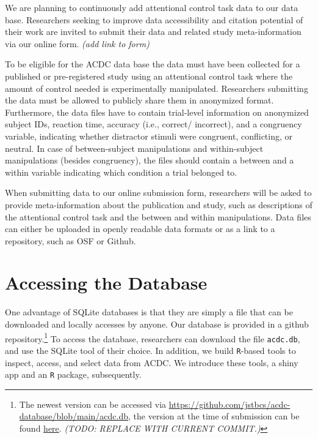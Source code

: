 \documentclass[
  man,floatsintext]{apa6}
\begin{document}
We are planning to continuously add attentional control task data to our data base. Researchers seeking to improve data accessibility and citation potential of their work are invited to submit their data and related study meta-information via our online form. \emph{ (add link to form)}

To be eligible for the ACDC data base the data must have been collected for a published or pre-registered study using an attentional control task where the amount of control needed is experimentally manipulated. Researchers submitting the data must be allowed to publicly share them in anonymized format. Furthermore, the data files have to contain trial-level information on anonymized subject IDs, reaction time, accuracy (i.e., correct/ incorrect), and a congruency variable, indicating whether distractor stimuli were congruent, conflicting, or neutral. In case of between-subject manipulations and within-subject manipulations (besides congruency), the files should contain a between and a within variable indicating which condition a trial belonged to.

When submitting data to our online submission form, researchers will be asked to provide meta-information about the publication and study, such as descriptions of the attentional control task and the between and within manipulations. Data files can either be uploaded in openly readable data formats or as a link to a repository, such as OSF or Github.

\hypertarget{accessing-the-database}{%
\section{Accessing the Database}\label{accessing-the-database}}

One advantage of SQLite databases is that they are simply a file that can be downloaded and locally accesses by anyone. Our database is provided in a github repository.\footnote{The newest version can be accessed via \url{https://github.com/jstbcs/acdc-database/blob/main/acdc.db}, the version at the time of submission can be found \href{https://github.com/jstbcs/acdc-database/blob/main/acdc.db}{here}. \emph{ (TODO: REPLACE WITH CURRENT COMMIT.)}} To access the database, researchers can download the file \texttt{acdc.db}, and use the SQLite tool of their choice. In addition, we build \texttt{R}-based tools to inspect, access, and select data from ACDC. We introduce these tools, a shiny app and an \texttt{R} package, subsequently.
\end{document}
